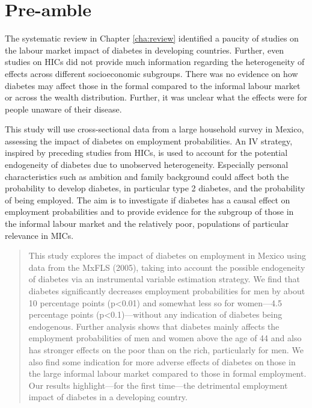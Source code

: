 \section*{Pre-amble}

The systematic review in Chapter \ref{cha:review} identified a paucity of studies on the labour market impact of diabetes in developing countries. Further, even studies on \acp{HIC} did not provide much information regarding the heterogeneity of effects across different socioeconomic subgroups. There was no evidence on how diabetes may affect those in the formal compared to the informal labour market or across the wealth distribution. Further, it was unclear what the effects were for people unaware of their disease.

This study will use cross-sectional data from a large household survey in Mexico, assessing the impact of diabetes on employment probabilities. An \ac{IV} strategy, inspired by preceding studies from \acp{HIC}, is used to account for the potential endogeneity of diabetes due to unobserved heterogeneity. Especially personal characteristics such as ambition and family background could affect both the probability to develop diabetes, in particular type 2 diabetes, and the probability of being employed. The aim is to investigate if diabetes has a causal effect on employment probabilities and to provide evidence for the subgroup of those in the informal labour market and the relatively poor, populations of particular relevance in \acp{MIC}.
 \newpage 

\begin{abstract}
This study explores the impact of diabetes on employment in Mexico using data from the \acf{MxFLS} (2005), taking into account the possible endogeneity of diabetes via an instrumental variable estimation strategy. We find that diabetes significantly decreases employment probabilities for men by about 10 percentage points (p<0.01) and somewhat less so for women---4.5 percentage points (p<0.1)---without any indication of diabetes being endogenous. Further analysis shows that diabetes mainly affects the employment probabilities of men and women above the age of 44 and also has stronger effects on the poor than on the rich, particularly for men. We also find some indication for more adverse effects of diabetes on those in the large informal labour market compared to those in formal employment. Our results highlight---for the first time---the detrimental employment impact of diabetes in a developing country.
\end{abstract}

